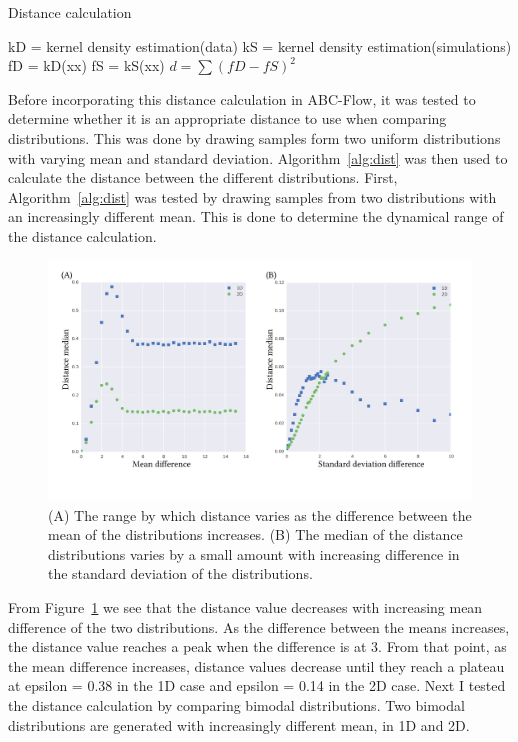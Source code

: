 \begin{algorithm}[tb]
\caption{Distance calculation}
\label{alg:dist}
 \begin{algorithmic}[1]
    \Statex
	\State kD = kernel density estimation(data)
	\State kS = kernel density estimation(simulations)
	\State fD = kD(xx)
	\State fS = kS(xx)    
	\State $d = \sum(fD-fS)^2$
  \end{algorithmic}
\end{algorithm}

Before incorporating this distance calculation in ABC-Flow, it was tested to determine whether it is an appropriate distance to use when comparing distributions. This was done by drawing samples form two uniform distributions with varying mean and standard deviation. Algorithm~\ref{alg:dist} was then used to calculate the distance between the different distributions. First, Algorithm~\ref{alg:dist} was tested by drawing samples from two distributions with an increasingly different mean. This is done to determine the dynamical range of the distance calculation.

\begin{figure}[htb]
\centering
\includegraphics[scale=0.7]{../../chapters/chapterABCFlow/images/mus_sigmas-01.png}
\caption[Range of distance values using the kernel distance]{\label{fig:epsilon_mu_s_diff}(A) The range by which distance varies as the difference between the mean of the distributions increases. (B) The median of the distance distributions varies by a small amount with increasing difference in the standard deviation of the distributions.}
\end{figure}

From Figure~\ref{fig:epsilon_mu_s_diff} we see that the distance value decreases with increasing mean difference of the two distributions. As the difference between the means increases, the distance value reaches a peak when the difference is at 3. From that point, as the mean difference increases, distance values decrease until they reach a plateau at epsilon = 0.38 in the 1D case and epsilon = 0.14 in the 2D case. Next I tested the distance calculation by comparing bimodal distributions. Two bimodal distributions are generated with increasingly different mean, in 1D and 2D. 


